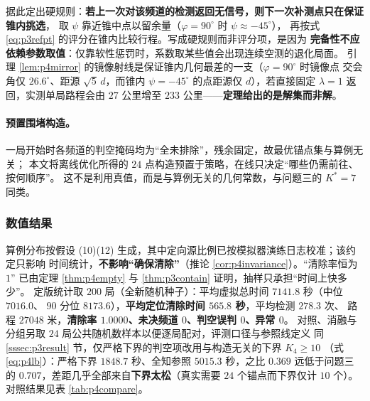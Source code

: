 \documentclass[withoutpreface, bwprint]{cumcmthesis}
\begin{document}
据此定出硬规则：\textbf{若上一次对该频道的检测返回无信号，则下一次补测点只在保证锥内挑选}，
取 $\psi$ 靠近锥中点以留余量（$\varphi=90^\circ$ 时 $\psi\approx-45^\circ$），
再按式 \eqref{eq:p3refpt} 的评分在锥内比较行程。写成硬规则而非评分项，是因为
\textbf{完备性不应依赖参数取值}：仅靠软性惩罚时，系数取某些值会出现连续空测的退化局面。
引理 \ref{lem:p4mirror} 的镜像射线是保证锥内几何最差的一支（$\varphi=90^\circ$ 时镜像点
交会角仅 $26.6^\circ$、距源 $\sqrt5\,d$，而锥内 $\psi=-45^\circ$ 的点距源仅 $d$），若直接固定
$\lambda=1$ 返回，实测单局路程会由 $27$ 公里增至 $233$ 公里——\textbf{定理给出的是解集而非解}。

\paragraph{预置围堵构造。}
一局开始时各频道的判空掩码均为“全未排除”，残余固定，故最优锚点集与算例无关；
本文将离线优化所得的 $24$ 点构造预置于策略，在线只决定“哪些仍需前往、按何顺序”。
这不是利用真值，而是与算例无关的几何常数，与问题三的 $K^{*}=7$ 同类。

\subsubsection{数值结果}
\label{sssec:p4result}

算例分布按假设 (10)(12) 生成，其中定向源比例已按模拟器演练日志校准；该约定只影响
时间统计，\textbf{不影响“确保清除”}（推论 \ref{cor:p4invariance}）。“清除率恒为 $1$”
已由定理 \ref{thm:p4empty} 与 \ref{thm:p3contain} 证明，抽样只承担“时间上快多少”。
定版统计取 $200$ 局（全新随机种子）：平均虚拟总时间 $7141.8$ 秒（中位 $7016.0$、
$90$ 分位 $8173.6$），\textbf{平均定位清除时间 $565.8$ 秒}，平均检测 $278.3$ 次、
路程 $27048$ 米，\textbf{清除率 $1.0000$、未决频道 $0$、判空误判 $0$、异常 $0$}。
对照、消融与分组另取 $24$ 局公共随机数样本以便逐局配对，评测口径与参照线定义
同 \ref{sssec:p3result} 节，仅严格下界的判空项改用与构造无关的下界 $K_4\ge 10$
（式 \eqref{eq:p4lb}）：严格下界 $1848.7$ 秒、全知参照 $5015.3$ 秒，之比 $0.369$
远低于问题三的 $0.707$，差距几乎全部来自\textbf{下界太松}（真实需要 $24$ 个锚点而下界仅计 $10$ 个）。
对照结果见表 \ref{tab:p4compare}。
\end{document}
